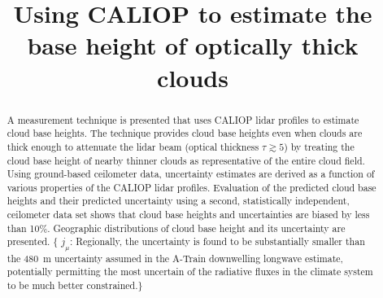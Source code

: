 \documentclass[essd,manuscript]{copernicus}\usepackage[]{graphicx}\usepackage[]{color}
\newcommand{\hlnum}[1]{\textcolor[rgb]{0.686,0.059,0.569}{#1}}%
\newcommand\comment[2]{\{\hlnum{ \textit{#1}: #2}\}}
\newcommand\commentjm[1]{\comment{$j_\mu$}{#1}}
\begin{document}

\title{Using CALIOP to estimate the base height of optically thick clouds}













\received{}
\pubdiscuss{} %
\revised{}
\accepted{}
\published{}




\maketitle



\begin{abstract}
  A measurement technique is presented that uses CALIOP lidar profiles to
  estimate cloud base heights.  The technique provides cloud base heights even
  when clouds are thick enough to attenuate the lidar beam (optical thickness
  $\tau \gtrsim 5$) by treating the cloud base height of nearby thinner clouds as
  representative of the entire cloud field.  Using ground-based ceilometer data,
  uncertainty estimates are derived as a function of various properties of the
  CALIOP lidar profiles.  Evaluation of the predicted cloud base heights and
  their predicted uncertainty using a second, statistically independent,
  ceilometer data set shows that cloud base heights and uncertainties are biased
  by less than 10\%.  Geographic distributions of cloud base height and its
  uncertainty are presented.  \commentjm{Regionally, the uncertainty is found to be
  substantially smaller than the 480~m uncertainty assumed in the A-Train
  downwelling longwave estimate, potentially permitting the most uncertain of
  the radiative fluxes in the climate system to be much better constrained.}
\end{abstract}
\end{document}
